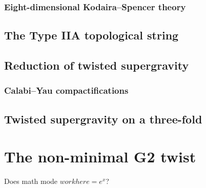 \documentclass[11pt]{amsart}
\begin{document}
\subsubsection{Eight-dimensional Kodaira--Spencer theory}
\label{sec:orgeb2dd4d}
\subsection{The Type IIA topological string}
\label{IIAtop}
\subsection{Reduction of twisted supergravity}
\label{sec:orgcf7b6a4}
\subsubsection{Calabi--Yau compactifications}
\label{sec:org16a2c98}
\subsection{Twisted supergravity on a three-fold}
\label{sec:org774abb4}
\section{The non-minimal G2 twist}
\label{sec:org590ab85}
Does math mode \(work here = e^x\)?
\end{document}
